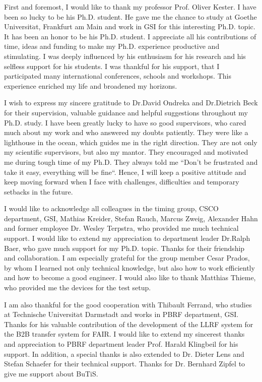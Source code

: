 First and foremost, I would like to thank my professor Prof. Oliver Kester. I have been so lucky to be his Ph.D. student. He gave me the chance to study at Goethe Universit$\ddot{a}$t, Frankfurt am Main and work in GSI for this interesting Ph.D. topic. It has been an honor to be his Ph.D. student. I appreciate all his contributions of time, ideas and funding to make my Ph.D. experience productive and stimulating. I was deeply influenced by his enthusiasm for his research and his selfless support for his students. I was thankful for his support, that I participated many international conferences, schools and workshops. This experience enriched my life and  
broadened my horizons.

I wish to express my sincere gratitude to Dr.David Ondreka and Dr.Dietrich Beck for their supervision, valuable guidance and helpful suggestions throughout my Ph.D. study. I have been greatly lucky to have so good supervisors, who cared much about my work and who answered my doubts patiently. They were like a lighthouse in the ocean, which guides me in the right direction. They are not only my  scientific supervisors, but also my mantor. They encouraged and motivated me during tough time of my Ph.D. They always told me ``Don't be frustrated and take it easy, everything will be fine``. Hence, I will  keep a positive attitude and keep moving forward when I face with challenges, difficulties and temporary setbacks in the future.

I would like to acknowledge all colleagues in the timing group, \gls{CSCO} department, GSI, Mathias Kreider, Stefan Rauch, Marcus Zweig, Alexander Hahn and former employee Dr. Wesley Terpstra, who provided me much technical support. I would like to extend my appreciation to department leader Dr.Ralph Baer, who gave much support for my Ph.D. topic. Thanks for their friendship and collaboration. I am especially grateful for the group member Cesar Prados, by whom I learned not only technical knowledge, but also how to work efficiently and how to become a good engineer. I would also like to thank Matthias Thieme, who provided me the devices for the test setup.  

I am also thankful for the good cooperation with Thibault Ferrand, who studies at Technische Universit$\ddot{a}$t Darmstadt and works in \gls{PBRF} department, GSI. Thanks for his valuable contribution of the development of the LLRF system for the B2B transfer system for FAIR. I would like to extend my sincerest thanks and appreciation to PBRF department leader Prof. Harald Klingbeil for his support. In addition, a special thanks is also extended to Dr. Dieter Lens and Stefan Schaefer for their technical support. Thanks for Dr. Bernhard Zipfel to give me support about BuTiS.

